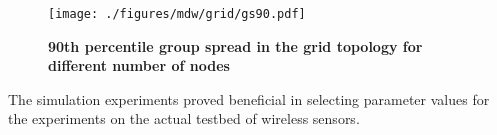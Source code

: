 \begin{figure}[p]
\begin{center}
\texttt{[image: ./figures/mdw/grid/gs90.pdf]}
\end{center}
\caption{{\small {\bf 90th percentile group spread in the grid topology for different number of nodes}}}
\label{fig:grid90}
\end{figure}


The simulation experiments proved beneficial in selecting parameter values for 
the experiments on the actual testbed of wireless sensors.  


